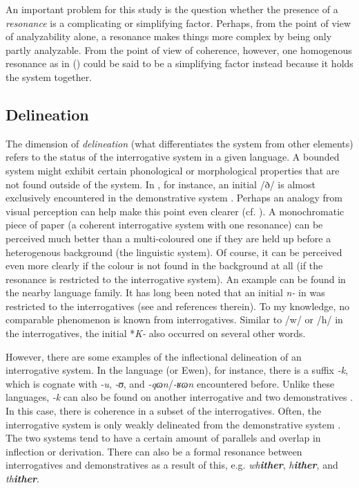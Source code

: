 \documentclass[output=paper,hidelinks]{langscibook}
\begin{document}
An important problem for this study is the question whether the presence of a \textit{resonance} is a complicating or simplifying factor. Perhaps, from the point of view of analyzability alone, a resonance makes things more complex by being only partly analyzable. From the point of view of coherence, however, one homogenous resonance as in  () could be said to be a simplifying factor instead because it holds the system together.

\subsection{Delineation}
\begin{sloppypar}
The dimension of \textit{delineation} (what differentiates the system from other elements) refers to the status of the interrogative system in a given language. A bounded system might exhibit certain phonological or morphological properties that are not found outside of the system. In , for instance, an initial /ð/ is almost exclusively encountered in the demonstrative system \citep[209]{BickelNichols2007}. Perhaps an analogy from visual perception can help make this point even clearer (cf. \citealt{Turvey2009}). A monochromatic piece of paper (a coherent interrogative system with one resonance) can be perceived much better than a multi-coloured one if they are held up before a heterogenous background (the linguistic system). Of course, it can be perceived even more clearly if the colour is not found in the background at all (if the resonance is restricted to the interrogative system). An example can be found in the nearby  language family. It has long been noted that an initial \textit{n-} in  was restricted to the interrogatives (see \citealt[354]{Hölzl2018b} and references therein). To my knowledge, no comparable phenomenon is known from  interrogatives. Similar to  /w/ or /h/ in the interrogatives, the  initial *\textit{K-} also occurred on several other words.
\end{sloppypar}

However, there are some examples of the inflectional delineation of an interrogative system. In the  language  (or Ewen), for instance, there is a suffix \textit{-k}, which is cognate with  \textit{-u},  \textit{-ʊ}, and  \textit{-qɷn}/\textit{-ʁɷn} encountered before. Unlike these languages,  \textit{-k} can also be found on another interrogative and two demonstratives \citep[77, 79]{Benzing1955}. In this case, there is coherence in a subset of the interrogatives. Often, the interrogative system is only weakly delineated from the demonstrative system \citep{Diessel2003}. The two systems tend to have a certain amount of parallels and overlap in inflection or derivation. There can also be a formal resonance between interrogatives and demonstratives as a result of this, e.g.  \textit{wh\textbf{ither}}, \textit{h\textbf{ither}}, and \textit{th\textbf{ither}}.
\end{document}
